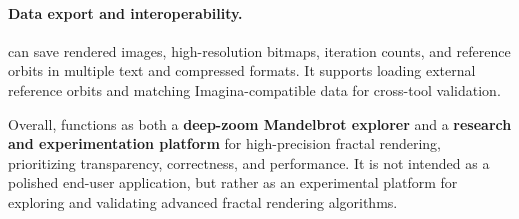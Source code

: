 \paragraph{Data export and interoperability.}
\FractalShark{} can save rendered images, high-resolution bitmaps, iteration
counts, and reference orbits in multiple text and compressed formats.  It
supports loading external reference orbits and matching Imagina-compatible
data for cross-tool validation.

\medskip
\noindent
Overall, \FractalShark{} functions as both a \textbf{deep-zoom Mandelbrot
explorer} and a \textbf{research and experimentation platform} for
high-precision fractal rendering, prioritizing transparency, correctness, and
performance.  It is not intended as a polished end-user application, but rather
as an experimental platform for exploring and validating advanced fractal
rendering algorithms.

